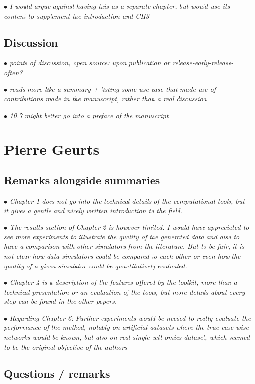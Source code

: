 \documentclass[10pt]{article}
\newcommand{\exam}[2][\  ]{\hspace{0pt}\marginpar{\color{red}#1}$\bullet$ \textit{#2}}
\newcommand{\imp}[1]{{\color{red} #1}}
\newcommand{\bigexclaim}{\raisebox{-0.1em}{\BigTriangleUp}\hspace{-0.32em}\llap{\small\textbf{!}}\hspace{0.32em}}
\newcommand{\tagimp}{\bigexclaim}
\begin{document}
{\exam{I would argue against having this as a separate chapter, but would use its content to supplement the introduction and CH3}

\subsection{Discussion}

\exam{points of discussion, open source: upon publication or release-early-release-often?}

\exam[\tagimp]{\imp{reads more like a summary} + listing some use case that made use of contributions made in the manuscript, rather than a real discussion}

\exam{10.7 might better go into a preface of the manuscript}

\section{Pierre Geurts}

\subsection{Remarks alongside summaries}
\exam{Chapter 1 does not go into the technical details of the computational tools, but it gives a gentle and nicely written introduction to the field.}

\exam{The results
	section of Chapter 2 is however limited. I would have appreciated to see more experiments to illustrate the
	quality of the generated data and also to have a comparison with other simulators from the
	literature. But to be fair, it is not clear how data simulators could be compared to each other or
	even how the quality of a given simulator could be quantitatively evaluated.}

\exam{Chapter 4 is a description of the features offered by the toolkit, more than a technical presentation
	or an evaluation of the tools, but more details about every step can be found in the other papers.}

\exam{Regarding Chapter 6: Further experiments
	would be needed to really evaluate the performance of the method, notably on artificial datasets
	where the true case-wise networks would be known, but also on real single-cell omics dataset,
	which seemed to be the original objective of the authors.}

\subsection{Questions / remarks} 

}
\end{document}
